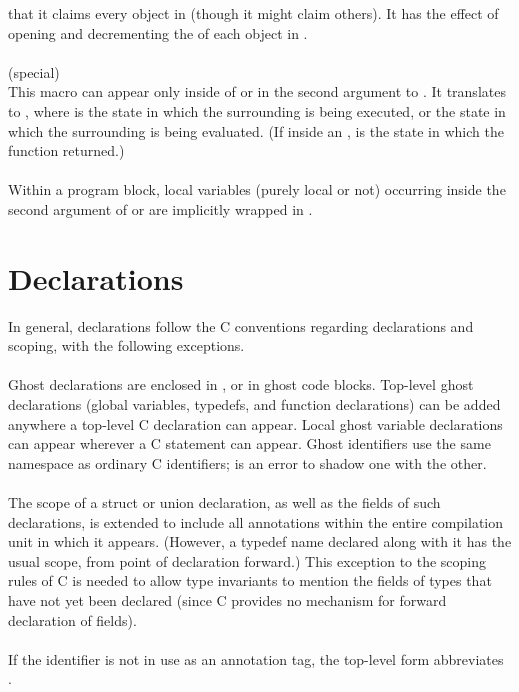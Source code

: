 \documentclass[preprint,nocopyrightspace]{sigplanconf}
\begin{document}
{{{that it claims every object in  (though it might claim
others). It has the effect of opening  and decrementing
the  of each object in .
\\\\
 (special)\\
This macro can appear only inside of \vcc{\claims} or in the second
argument to . It translates to , where
 is the state in which the surrounding  is
being executed, or the state in which the surrounding \vcc{\claims} is
being evaluated. (If inside an ,  is the state
in which the function returned.)
\\\\
Within a program block, local variables (purely local or not) occurring
inside the second argument of \vcc{\claims} or  are
implicitly wrapped in .

\section{Declarations}
In general, declarations follow the C conventions regarding
declarations and scoping, with the following exceptions. 
\\\\
Ghost declarations are enclosed in , or in ghost code
blocks.  Top-level ghost declarations (global variables, typedefs, and
function declarations) can be added anywhere a top-level C declaration
can appear. Local ghost variable declarations can appear wherever a C
statement can appear.  Ghost identifiers use the same namespace as
ordinary C identifiers; is an error to shadow one with the other.
\\\\
The scope of a struct or union declaration, as well as the fields of
such declarations, is extended to include all annotations within the
entire compilation unit in which it appears. (However, a typedef name
declared along with it has the usual scope, from point of declaration
forward.) This exception to the scoping rules of C is needed to allow
type invariants to mention the fields of types that have not yet been
declared (since C provides no mechanism for forward declaration of
fields).
\\\\
If the identifier  is not in use as an annotation tag, the
top-level form  abbreviates .

}}}
\end{document}
